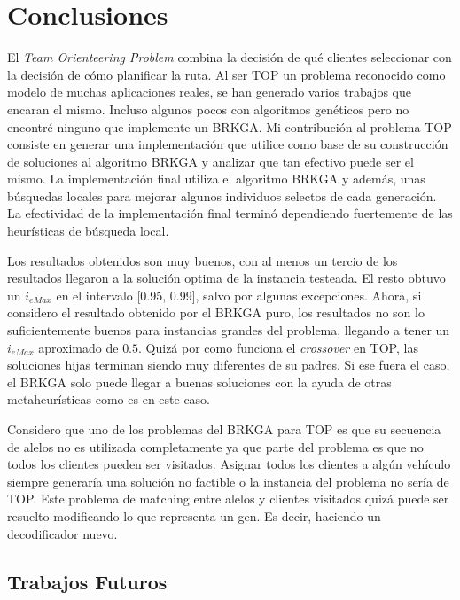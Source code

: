 \chapter{Conclusiones}

\bigskip

El \textit{Team Orienteering Problem} combina la decisión de qué clientes seleccionar con la decisión de cómo planificar la ruta. Al ser TOP un problema reconocido como modelo de muchas aplicaciones reales, se han generado varios trabajos que encaran el mismo. Incluso algunos pocos con algoritmos genéticos pero no encontré ninguno que implemente un BRKGA. Mi contribución al problema TOP consiste en generar una implementación que utilice como base de su construcción de soluciones al algoritmo BRKGA y analizar que tan efectivo puede ser el mismo. La implementación final utiliza el algoritmo BRKGA y además, unas búsquedas locales para mejorar algunos individuos selectos de cada generación. La efectividad de la implementación final terminó dependiendo fuertemente de las heurísticas de búsqueda local.

\bigskip

Los resultados obtenidos son muy buenos, con al menos un tercio de los resultados llegaron a la solución optima de la instancia testeada. El resto obtuvo un $i_{eMax}$ en el intervalo [0.95, 0.99], salvo por algunas excepciones. Ahora, si considero el resultado obtenido por el BRKGA puro, los resultados no son lo suficientemente buenos para instancias grandes del problema, llegando a tener un $i_{eMax}$ aproximado de $0.5$. Quizá por como funciona el \textit{crossover} en TOP, las soluciones hijas terminan siendo muy diferentes de su padres. Si ese fuera el caso, el BRKGA solo puede llegar a buenas soluciones con la ayuda de otras metaheurísticas como es en este caso.

\bigskip

Considero que uno de los problemas del BRKGA para TOP es que su secuencia de alelos no es utilizada completamente ya que parte del problema es que no todos los clientes pueden ser visitados. Asignar todos los clientes a algún vehículo siempre generaría una solución no factible o la instancia del problema no sería de TOP. Este problema de matching entre alelos y clientes visitados quizá puede ser resuelto modificando lo que representa un gen. Es decir, haciendo un decodificador nuevo.

\section{Trabajos Futuros}

